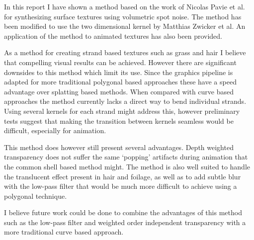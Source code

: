 \documentclass{article}
\begin{document}
In this report I have shown a method based on the work of Nicolas Pavie et al. for synthesizing surface textures using volumetric spot noise. The method has been modified to use the two dimensional kernel by Matthias Zwicker et al. An application of the method to animated textures has also been provided.

As a method for creating strand based textures such as grass and hair I believe that compelling visual results can be achieved. However there are significant downsides to this method which limit its use. Since the graphics pipeline is adapted for more traditional polygonal based approaches these have a speed advantage over splatting based methods.
When compared with curve based approaches the method currently lacks a direct way to bend individual strands. Using several kernels for each strand might address this, however preliminary tests suggest that making the transition between kernels seamless would be difficult, especially for animation.

This method does however still present several advantages. Depth weighted transparency does not suffer the same `popping' artifacts during animation that the common shell based method might. The method is also well suited to handle the translucent effect present in hair and foilage, as well as to add subtle blur with the low-pass filter that would be much more difficult to achieve using a polygonal technique.

I believe future work could be done to combine the advantages of this method such as the low-pass filter and weighted order independent transparency with a more traditional curve based approach.

\printbibliography{}
\end{document}
